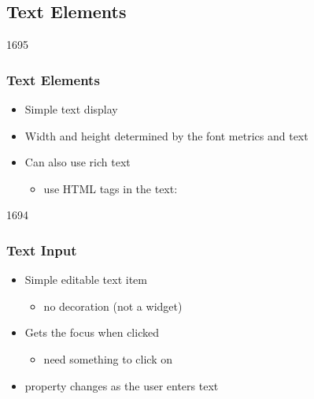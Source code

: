 %
%
%
%

\subsection{Text Elements}

\begin{slide}{1695}\frametitle{Text Elements}


\begin{itemize}
\item Simple text display
\item Width and height determined by the font metrics and text
\item Can also use rich text
  \begin{itemize}
  \item use HTML tags in the text: 
  \end{itemize}
\end{itemize}  

\end{slide}


\begin{slide}{1694}\frametitle{Text Input}


\begin{itemize}
\item Simple editable text item
  \begin{itemize}
  \item no decoration (not a  widget)
  \end{itemize}
\item Gets the focus when clicked
  \begin{itemize}
  \item need something to click on
  \end{itemize}
\item {} property changes as the user enters text
\end{itemize}

\end{slide}                                                        
